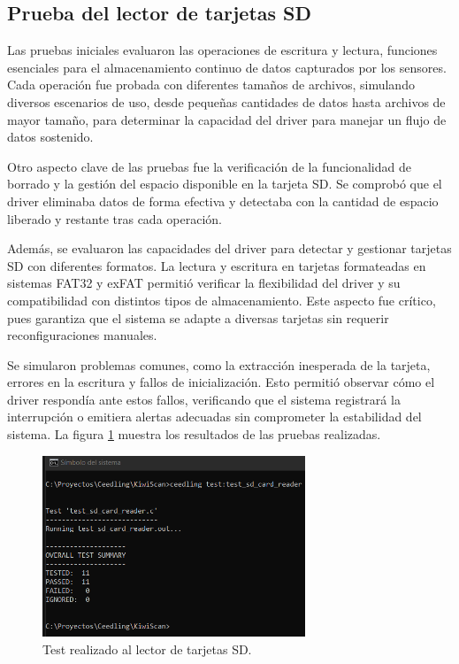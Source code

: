 \vspace{1cm}

\subsection{Prueba del lector de tarjetas SD}

Las pruebas iniciales evaluaron las operaciones de escritura y lectura, funciones esenciales para el almacenamiento continuo de datos capturados por los sensores. Cada operación fue probada con diferentes tamaños de archivos, simulando diversos escenarios de uso, desde pequeñas cantidades de datos hasta archivos de mayor tamaño, para determinar la capacidad del driver para manejar un flujo de datos sostenido.

Otro aspecto clave de las pruebas fue la verificación de la funcionalidad de borrado y la gestión del espacio disponible en la tarjeta SD. Se comprobó que el driver eliminaba datos de forma efectiva y detectaba con la cantidad de espacio liberado y restante tras cada operación.

Además, se evaluaron las capacidades del driver para detectar y gestionar tarjetas SD con diferentes formatos. La lectura y escritura en tarjetas formateadas en sistemas FAT32 y exFAT permitió verificar la flexibilidad del driver y su compatibilidad con distintos tipos de almacenamiento. Este aspecto fue crítico, pues garantiza que el sistema se adapte a diversas tarjetas sin requerir reconfiguraciones manuales.

Se simularon problemas comunes, como la extracción inesperada de la tarjeta, errores en la escritura y fallos de inicialización. Esto permitió observar cómo el driver respondía ante estos fallos, verificando que el sistema registrará la interrupción o emitiera alertas adecuadas sin comprometer la estabilidad del sistema. La figura \ref{fig:test_sd_card_reader} muestra los resultados de las pruebas realizadas.

\vspace{1cm}

\begin{figure}[htbp]
	\centering
	\includegraphics[width=0.7\textwidth, height=0.3\textheight]{./Figures/test_sd_card_reader.png}
	\caption{Test realizado al lector de tarjetas SD.}
	\label{fig:test_sd_card_reader}
\end{figure}

